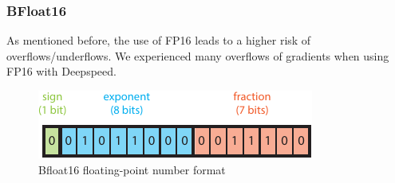 \subsubsection{BFloat16}

As mentioned before, the use of FP16 leads to a higher risk of overflows/underflows. We experienced many overflows 
of gradients when using FP16 with Deepspeed. 

\begin{figure}[h]
    \centering
    \includegraphics{figures/mixed_precision/bfloat16.pdf}
    \caption{Bfloat16 floating-point number format}
\end{figure}






